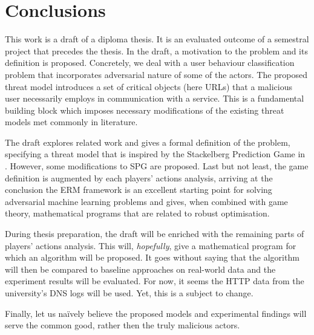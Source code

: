 \section{Conclusions}

This work is a draft of a diploma thesis. It is an evaluated outcome of
a semestral project that precedes the thesis. In the draft, a motivation
to the problem and its definition is proposed. Concretely, we deal with
a user behaviour classification problem that incorporates adversarial
nature of some of the actors. The proposed threat model introduces a set
of critical objects (here URLs) that a malicious user necessarily
employs in communication with a service. This is a fundamental building
block which imposes necessary modifications of the existing threat
models met commonly in literature.

The draft explores related work and gives a formal definition of the
problem, specifying a threat model that is inspired by the Stackelberg
Prediction Game in \cite{stackelberg_games}. However, some modifications to SPG
are proposed. Last but not least, the game definition is augmented by
each players’ actions analysis, arriving at the conclusion the ERM
framework is an excellent starting point for solving adversarial machine
learning problems and gives, when combined with game theory,
mathematical programs that are related to robust optimisation.

During thesis preparation, the draft will be enriched with the remaining
parts of players’ actions analysis. This will, \emph{hopefully}, give a
mathematical program for which an algorithm will be proposed. It goes
without saying that the algorithm will then be compared to baseline
approaches on real-world data and the experiment results will be
evaluated. For now, it seems the HTTP data from the university's DNS
logs will be used. Yet, this is a subject to change.

Finally, let us naïvely believe the proposed models and experimental
findings will serve the common good, rather then the truly malicious
actors.
